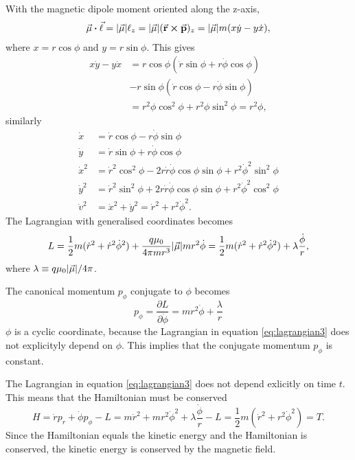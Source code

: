 \documentclass[11pt]{amsart}
\begin{document}
With the magnetic dipole moment oriented along the z-axis, 
\begin{align*}
\va{\mu}\vdot\va{\ell} = \abs{\va{\mu}}\ell_z = \abs{\va{\mu}}(\va{r}\cp\va{p})_z = \abs{\va{\mu}}m(x\dot{y}-y\dot{x}),
\end{align*} 
where $x = r\cos\phi$ and $y = r\sin\phi$. This gives
\begin{align*}
x\dot{y} - y\dot{x} &= r\cos\phi(\dot{r}\sin\phi + r\dot{\phi}\cos\phi) \\
					&- r\sin\phi(\dot{r}\cos\phi - r\dot{\phi}\sin\phi) \\
					&= r^2\phi\cos^2\phi + r^2\phi\sin^2\phi = r^2\phi,
\end{align*} 
similarly
\begin{align*}
\dot{x} &= \dot{r}\cos\phi - r\dot{\phi}\sin\phi \\
\dot{y} &= \dot{r}\sin\phi + r\dot{\phi}\cos\phi \\
\dot{x}^2 &= \dot{r}^2\cos^2\phi - 2r\dot{r}\dot{\phi}\cos\phi\sin\phi + r^2\dot{\phi}^2\sin^2\phi \\
\dot{y}^2 &= \dot{r}^2\sin^2\phi + 2r\dot{r}\dot{\phi}\cos\phi\sin\phi + r^2\dot{\phi}^2\cos^2\phi \\
\dot{v}^2 &= \dot{x}^2 + \dot{y}^2 = \dot{r}^2 + r^2\dot{\phi}^2.
\end{align*}
The Lagrangian with generalised coordinates becomes
\begin{equation}
\label{eq:lagrangian3}
L = \frac{1}{2}m(\dot{r}^2 + \dot{r}^2\dot{\phi}^2) + \frac{q\mu_0}{4\pi mr^3}\abs{\va{\mu}}mr^2\dot{\phi} = \frac{1}{2}m(\dot{r}^2 + \dot{r}^2\dot{\phi}^2) + \lambda\frac{\dot{\phi}}{r},
\end{equation}
where $\lambda \equiv q\mu_0\abs{\va{\mu}}/4\pi$. 

The canonical momentum $p_\phi$ conjugate to $\phi$ becomes
\begin{equation}
\label{eq:conjmomphi}
p_\phi = \frac{\partial L}{\partial \dot{\phi}} = mr^2\dot{\phi} + \frac{\lambda}{r}
\end{equation}
$\phi$ is a cyclic coordinate, because the Lagrangian in equation \ref{eq:lagrangian3} does not explicityly depend on $\phi$. This implies that the conjugate momentum $p_\phi$ is constant. 

The Lagrangian in equation \ref{eq:lagrangian3} does not depend exlicitly on time $t$. This means that the Hamiltonian must be conserved
\begin{equation}
H = \dot{r}p_r + \dot{\phi}p_\phi - L = m\dot{r}^2 + mr^2\dot{\phi}^2 + \lambda\frac{\dot{\phi}}{r} - L = \frac{1}{2}m(\dot{r}^2 + r^2\dot{\phi}^2) = T.
\end{equation}
Since the Hamiltonian equals the kinetic energy and the Hamiltonian is conserved, the kinetic energy is conserved by the magnetic field.
\end{document}
